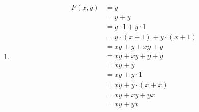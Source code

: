 \documentclass[12pt letter]{report}
\begin{document}
{\begin{enumerate}
\begin{align*}
			      \overline{y} \right) \tag*{By Unit Property}                                                      \\
			                            & =  xy + x\overline{y} + \overline{x}y + \overline{x}\overline{y} \tag*{By
			      Second Distributive Law}                                                                          \\
		      \end{align*}
		\item
		      \begin{align*}
			      F \left( x, y \right) & = y                                                                                          \\
			                            & = y + y \tag*{By First Idempotent Law}                                                       \\
			                            & = y\cdot 1 + y \cdot 1 \tag*{By Second Identity Law}                                         \\
			                            & = y \cdot \left( x + 1 \right) + y\cdot  \left( x + 1 \right) \tag*{By First Domination Law} \\
			                            & = xy + y + xy + y \tag*{By Second Distributive Law}                                          \\
			                            & = xy + xy + y + y \tag*{By First Commutative Law}                                            \\
			                            & = xy + y \tag*{By First Idempotent Law}                                                      \\
			                            & =  xy + y \cdot 1 \tag*{By Second Identity Law}                                              \\
			                            & = xy + y \cdot \left( x + \overline{x} \right) \tag*{By Unit Property Law}                   \\
			                            & = xy + xy + y\overline{x} \tag*{By Second Distributive Law}                                  \\
			                            & = xy + y\overline{x} \tag*{By First Idempotent Law }                                         \\
		      \end{align*}
	\end{enumerate}



}
\end{document}
